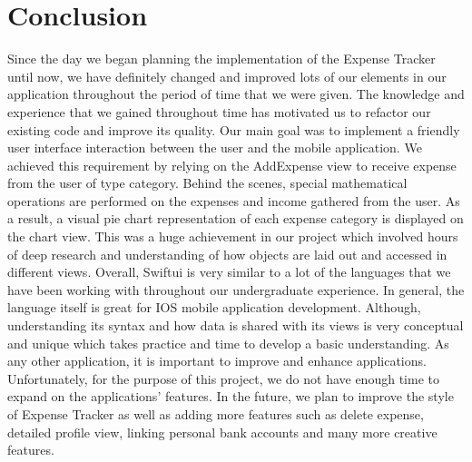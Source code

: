 \documentclass{article}
\begin{document}
\section{Conclusion}
Since the day we began planning the implementation of the Expense Tracker until now, we have definitely changed and improved lots of our elements in our application throughout the period of time that we were given. The knowledge and experience that we gained throughout time has motivated us to refactor our existing code and improve its quality. Our main goal was to implement a friendly user interface interaction between the user and the mobile application. We achieved this requirement by relying on the AddExpense view to receive expense from the user of type category. Behind the scenes, special mathematical operations are performed on the expenses and income gathered from the user. As a result, a visual pie chart representation of each expense category is displayed on the chart view. This was a huge achievement in our project which involved hours of deep research and understanding of how objects are laid out and accessed in different views. Overall, Swiftui is very similar to a lot of the languages that we have been working with throughout our undergraduate experience. In general, the language itself is great for IOS mobile application development. Although, understanding its syntax and how data is shared with its views is very conceptual and unique which takes practice and time to develop a basic understanding. As any other application, it is important to improve and enhance applications. Unfortunately, for the purpose of this project, we do not have enough time to expand on the applications’ features. In the future, we plan to improve the style of Expense Tracker as well as adding more features such as delete expense, detailed profile view, linking personal bank accounts and many more creative features.




\end{document}

